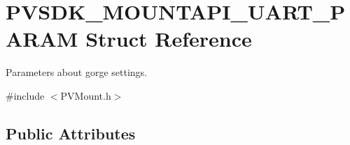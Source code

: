 \hypertarget{struct_p_v_s_d_k___m_o_u_n_t_a_p_i___u_a_r_t___p_a_r_a_m}{}\section{P\+V\+S\+D\+K\+\_\+\+M\+O\+U\+N\+T\+A\+P\+I\+\_\+\+U\+A\+R\+T\+\_\+\+P\+A\+R\+AM Struct Reference}
\label{struct_p_v_s_d_k___m_o_u_n_t_a_p_i___u_a_r_t___p_a_r_a_m}


Parameters about gorge settings.  




{\ttfamily \#include $<$P\+V\+Mount.\+h$>$}

\subsection*{Public Attributes}
